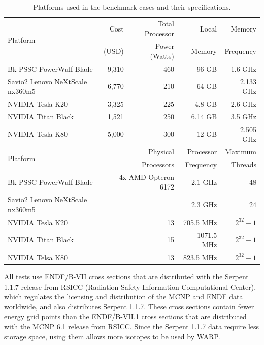 \documentclass[preprint,12pt]{elsarticle}
\begin{document}
\begin{table}[h]
\centering
\caption{Platforms used in the benchmark cases and their specifications.}
\label{platform_table}
\small
\begin{tabular}{| l | r | r | r | r |}
\hline
\multirow{2}{*}{Platform} &  Cost   &Total Processor  & Local       & Memory     \\
                                       & (USD)  & Power (Watts) & Memory  & Frequency \\
\hline
Bk PSSC PowerWulf Blade       &    9,310   & 460 &  96 GB        &  1.6 GHz                    \\
\hline
Savio2 Lenovo NeXtScale nx360m5       &   6,770    &  210  &  64 GB        & 2.133  GHz                    \\
\hline
NVIDIA Tesla K20         &    3,325     & 225 &  4.8  GB      &  2.6 GHz                  \\
\hline
NVIDIA Titan Black       &    1,521   & 250 &  6.14 GB        & 3.5 GHz              \\
\hline
NVIDIA Tesla K80       &    5,000    & 300 &  12 GB        &  2.505 GHz              \\
\hline
\hline
\hline
\multirow{2}{*}{Platform}  &  \multicolumn{2}{r|}{Physical }     & Processor  & Maximum \\
                                        & \multicolumn{2}{r|}{Processors}  & Frequency  & Threads \\
\hline
Bk PSSC PowerWulf Blade       &   \multicolumn{2}{r|}{4x AMD Opteron 6172 }  &  2.1 GHz     &  48           \\
\hline
Savio2 Lenovo NeXtScale nx360m5   &   \multicolumn{2}{r|}{ }  &  2.3 GHz     &  24           \\
\hline
NVIDIA Tesla K20         &       \multicolumn{2}{r|}{13}   &  705.5 MHz     &  $2^{32}-1$           \\
\hline
NVIDIA Titan Black       &      \multicolumn{2}{r|}{ 15 }  &  1071.5 MHz     & $2^{32}-1$           \\
\hline
NVIDIA Telsa K80      &      \multicolumn{2}{r|}{ 13 }  &  823.5 MHz     & $2^{32}-1$           \\
\hline

\end{tabular}
\end{table}

All tests use ENDF/B-VII cross sections that are distributed with the Serpent 1.1.7 release from RSICC (Radiation Safety Information Computational Center), which regulates the licensing and distribution of the MCNP and ENDF data worldwide, and also distributes Serpent 1.1.7.  These cross sections contain fewer energy grid points than the ENDF/B-VII.1 cross sections that are distributed with the MCNP 6.1 release from RSICC.  Since the Serpent 1.1.7 data require less storage space, using them allows more isotopes to be used by WARP.
\end{document}
